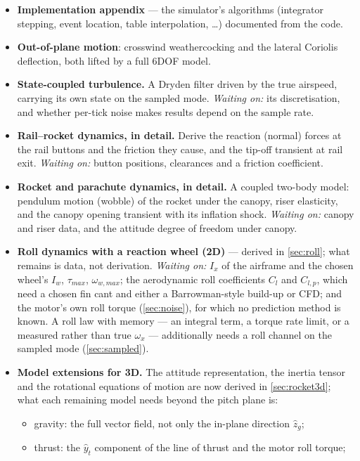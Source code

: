 \begin{itemize}
    populates the aerodynamic table for a specific airframe.
    \item \textbf{Implementation appendix} --- the simulator's algorithms (integrator stepping,
    event location, table interpolation, \dots) documented from the code.
    \item \textbf{Out-of-plane motion}: crosswind weathercocking and the lateral Coriolis
    deflection, both lifted by a full 6DOF model.
    \item \textbf{State-coupled turbulence.} A Dryden filter driven by the true airspeed, carrying
    its own state on the sampled mode. \emph{Waiting on:} its discretisation, and whether per-tick
    noise makes results depend on the sample rate.
    \item \textbf{Rail--rocket dynamics, in detail.} Derive the reaction (normal) forces at the
    rail buttons and the friction they cause, and the tip-off transient at rail exit. \emph{Waiting
    on:} button positions, clearances and a friction coefficient.
    \item \textbf{Rocket and parachute dynamics, in detail.} A coupled two-body model: pendulum
    motion (wobble) of the rocket under the canopy, riser elasticity, and the canopy opening
    transient with its inflation shock. \emph{Waiting on:} canopy and riser data, and the
    attitude degree of freedom under canopy.
    \item \textbf{Roll dynamics with a reaction wheel (2D)} --- derived in \autoref{sec:roll}; what
    remains is data, not derivation. \emph{Waiting on:} $I_x$ of the airframe and the chosen
    wheel's $I_w$, $\tau_{max}$, $\omega_{w,max}$; the aerodynamic roll coefficients $C_l$ and
    $C_{l,p}$, which need a chosen fin cant and either a Barrowman-style build-up or CFD; and the
    motor's own roll torque (\autoref{sec:noise}), for which no prediction method is known. A roll
    law with memory --- an integral term, a torque rate limit, or a measured rather than true
    $\omega_x$ --- additionally needs a roll channel on the sampled mode
    (\autoref{sec:sampled}).
    \item \textbf{Model extensions for 3D.} The attitude representation, the inertia tensor and the
    rotational equations of motion are now derived in \autoref{sec:rocket3d}; what each remaining
    model needs beyond the pitch plane is:
    \begin{itemize}
        \item gravity: the full vector field, not only the in-plane direction $\hat{z}_g$;
        \item thrust: the $\hat{y}_t$ component of the line of thrust and the motor roll torque;

\end{itemize}
\end{itemize}
